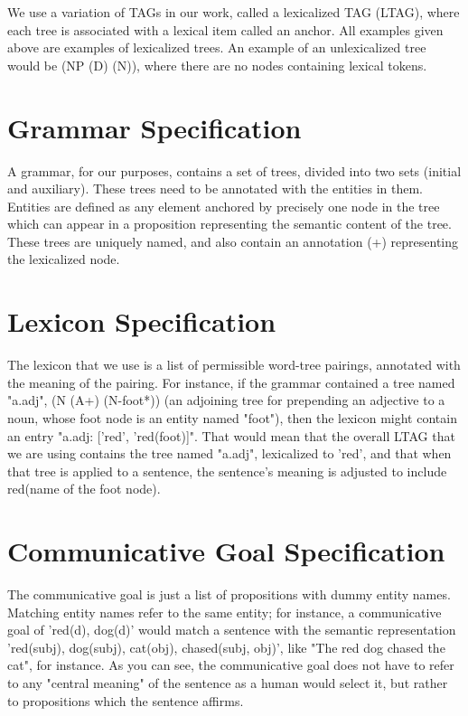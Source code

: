 We use a variation of TAGs in our work, called a lexicalized TAG (LTAG), where each tree is
associated with a lexical item called an anchor.  All examples given above are examples of
lexicalized trees.  An example of an unlexicalized tree would be (NP (D) (N)), where there
are no nodes containing lexical tokens.

\section{Grammar Specification}

A grammar, for our purposes, contains a set of trees, divided into two sets (initial and auxiliary).
These trees need to be annotated with the entities in them.  Entities are defined as any element
anchored by precisely one node in the tree which can appear in a proposition representing the
semantic content of the tree.  These trees are uniquely named, and also contain an
annotation (+) representing the lexicalized node.

\section{Lexicon Specification}

The lexicon that we use is a list of permissible word-tree pairings, annotated with the meaning of
the pairing.  For instance, if the grammar contained a tree named "a.adj", (N (A+) (N-foot*))
(an adjoining tree for prepending an adjective to a noun, whose foot node is an entity named "foot"),
then the lexicon might contain an entry "a.adj: ['red', 'red(foot)]".  That would mean that the overall
LTAG that we are using contains the tree named "a.adj", lexicalized to 'red', and that when that tree
is applied to a sentence, the sentence's meaning is adjusted to include red(name of the foot node).

\section{Communicative Goal Specification}

The communicative goal is just a list of propositions with dummy entity names.  Matching entity
names refer to the same entity; for instance, a communicative goal of 'red(d), dog(d)' would
match a sentence with the semantic representation 'red(subj), dog(subj), cat(obj), chased(subj, obj)',
like "The red dog chased the cat", for instance.  As you can see, the communicative goal does
not have to refer to any "central meaning" of the sentence as a human would select it, but rather
to propositions which the sentence affirms.